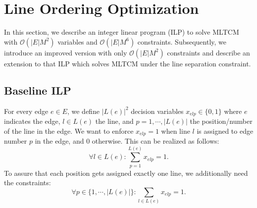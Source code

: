 \documentclass{llncs}
\begin{document}
%
\section{Line Ordering Optimization}\label{SEC:ordering}
%

In this section, we describe an integer linear program (ILP) to solve MLTCM with $\mathcal{O}(|E|M^{2})$ variables and $\mathcal{O}(|E|M^{6})$ constraints.
Subsequently, we introduce an improved version with only $\mathcal{O}(|E|M^2)$ constraints and describe an extension to that ILP which solves MLTCM under the line separation constraint.

%
\subsection{Baseline ILP}\label{SEC:baseline}
%
For every edge $e \in E$, we define $|L(e)|^{2}$ decision variables $x_{elp} \in \{0,1\}$ where $e$ indicates the edge, $l \in L(e)$ the line, and $p=1, \cdots, |L(e)|$ the position/number of the line in the edge. We want to enforce $x_{elp}=1$ when line $l$ is assigned to edge number $p$ in the edge, and $0$ otherwise. This can be realized as follows:
\begin{equation*}
\forall l \in L(e): \sum_{p=1}^{L(e)} x_{elp}=1.
\end{equation*}
To assure that each position gets assigned exactly one line, we additionally need the constraints:
\begin{equation*}
	\forall p \in  \{1,\cdots,|L(e)|\} : \sum_{l \in L(e)} x_{elp} = 1.
\end{equation*}
\end{document}
